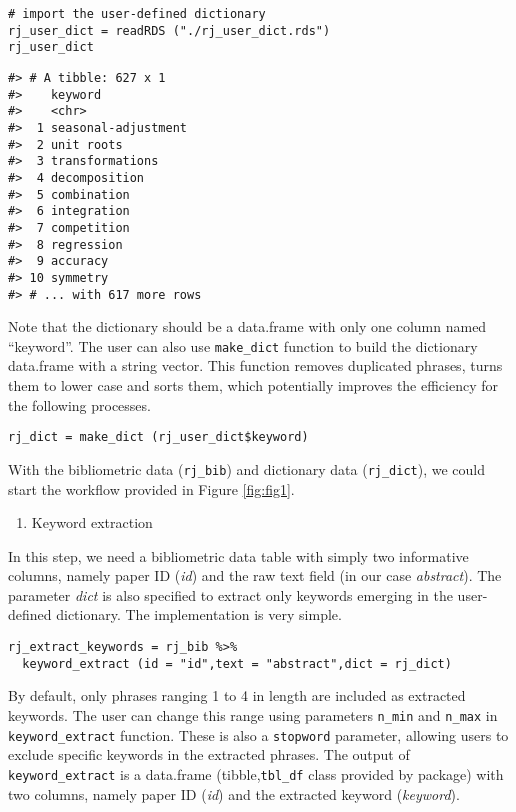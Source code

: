 \begin{verbatim}
# import the user-defined dictionary
rj_user_dict = readRDS ("./rj_user_dict.rds")
rj_user_dict
\end{verbatim}

\begin{verbatim}
#> # A tibble: 627 x 1
#>    keyword            
#>    <chr>              
#>  1 seasonal-adjustment
#>  2 unit roots         
#>  3 transformations    
#>  4 decomposition      
#>  5 combination        
#>  6 integration        
#>  7 competition        
#>  8 regression         
#>  9 accuracy           
#> 10 symmetry           
#> # ... with 617 more rows
\end{verbatim}

Note that the dictionary should be a data.frame with only one column named ``keyword''. The user can also use \texttt{make\_dict} function to build the dictionary data.frame with a string vector. This function removes duplicated phrases, turns them to lower case and sorts them, which potentially improves the efficiency for the following processes.

\begin{verbatim}
rj_dict = make_dict (rj_user_dict$keyword)
\end{verbatim}

With the bibliometric data (\texttt{rj\_bib}) and dictionary data (\texttt{rj\_dict}), we could start the workflow provided in Figure \ref{fig:fig1}.

\begin{enumerate}
\def\labelenumi{(\arabic{enumi})}
\tightlist
\item
  Keyword extraction
\end{enumerate}

In this step, we need a bibliometric data table with simply two informative columns, namely paper ID (\emph{id}) and the raw text field (in our case \emph{abstract}). The parameter \emph{dict} is also specified to extract only keywords emerging in the user-defined dictionary. The implementation is very simple.

\begin{verbatim}
rj_extract_keywords = rj_bib %>% 
  keyword_extract (id = "id",text = "abstract",dict = rj_dict)
\end{verbatim}

By default, only phrases ranging 1 to 4 in length are included as extracted keywords. The user can change this range using parameters \texttt{n\_min} and \texttt{n\_max} in \texttt{keyword\_extract} function. These is also a \texttt{stopword} parameter, allowing users to exclude specific keywords in the extracted phrases. The output of \texttt{keyword\_extract} is a data.frame (tibble,\texttt{tbl\_df} class provided by  package) with two columns, namely paper ID (\emph{id}) and the extracted keyword (\emph{keyword}).

